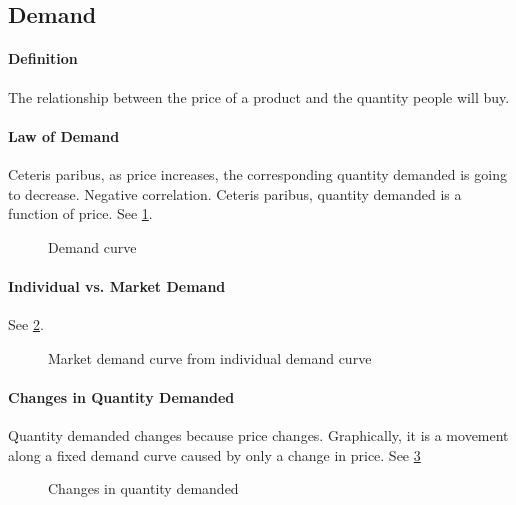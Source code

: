 
\subsection{Demand}
\paragraph{Definition} The relationship between the price of a product and the quantity people will buy.
\paragraph{Law of Demand} Ceteris paribus, as price increases, the corresponding quantity demanded is going to decrease. Negative correlation.
Ceteris paribus, quantity demanded is a function of price. See \cref{fig:demand_individual_curve}.

\begin{figure}[ht]
	\centering
	\caption{Demand curve}
	\label{fig:demand_individual_curve}
\end{figure}

\paragraph{Individual vs. Market Demand} See \cref{fig:individual_demand_to_market}.
\begin{figure}[ht]
	\centering
	\caption{Market demand curve from individual demand curve}
	\label{fig:individual_demand_to_market}
\end{figure}

\paragraph{Changes in Quantity Demanded} Quantity demanded changes because price changes. Graphically, it is a movement along a fixed demand curve caused by only a change in price. See \cref{fig:changes_in_quantity_demanded}

\begin{figure}[ht]
	\centering
	\caption{Changes in quantity demanded}
	\label{fig:changes_in_quantity_demanded}
\end{figure}

